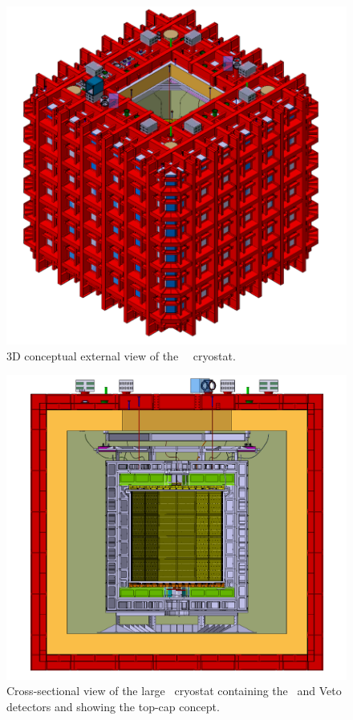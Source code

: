 \begin{figure}[!t]
\includegraphics[height=0.6\textheight]{./Figures/cryostat_iso_crop.png}
\caption[3D view of the large \AAr\ cryostat]{3D conceptual external view of the \DSks\ \AAr\ cryostat.}
\label{fig:CryostatExternal}
\end{figure}

\begin{figure}[htbp]
\includegraphics[height=0.6\textheight]{./Figures/cryostat_section_view_crop.png}
\caption[Cross-sectional view of the large \AAr\ cryostat]{Cross-sectional view of the large \AAr\ cryostat containing the \LArTPC\ and Veto detectors and showing the top-cap concept.}
\label{fig:CryostatAssembly}
\end{figure}

